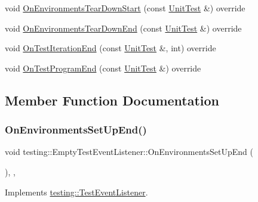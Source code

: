 \begin{DoxyCompactItemize}
\item 
void \hyperlink{classtesting_1_1EmptyTestEventListener_a320780451eac9178434b7c77d948ecbd}{On\+Environments\+Tear\+Down\+Start} (const \hyperlink{classtesting_1_1UnitTest}{Unit\+Test} \&) override
\item 
void \hyperlink{classtesting_1_1EmptyTestEventListener_ad9984052e82c3ae26395a2d9480326d2}{On\+Environments\+Tear\+Down\+End} (const \hyperlink{classtesting_1_1UnitTest}{Unit\+Test} \&) override
\item 
void \hyperlink{classtesting_1_1EmptyTestEventListener_aae9c5c61e476f0c421402fb1dde434d2}{On\+Test\+Iteration\+End} (const \hyperlink{classtesting_1_1UnitTest}{Unit\+Test} \&, int) override
\item 
void \hyperlink{classtesting_1_1EmptyTestEventListener_aaa9d683e8e0c850af67a0b92d785ddb9}{On\+Test\+Program\+End} (const \hyperlink{classtesting_1_1UnitTest}{Unit\+Test} \&) override
\end{DoxyCompactItemize}


\subsection{Member Function Documentation}
\mbox{\label{classtesting_1_1EmptyTestEventListener_a9b4e781c0b38065a55c2fd163724ba69}} 
\subsubsection{\texorpdfstring{On\+Environments\+Set\+Up\+End()}{OnEnvironmentsSetUpEnd()}}
{\footnotesize\ttfamily void testing\+::\+Empty\+Test\+Event\+Listener\+::\+On\+Environments\+Set\+Up\+End (\begin{DoxyParamCaption}\item[{const \hyperlink{classtesting_1_1UnitTest}{Unit\+Test} \&}]{ }\end{DoxyParamCaption})\hspace{0.3cm}{\ttfamily [inline]}, {\ttfamily [override]}, {\ttfamily [virtual]}}



Implements \hyperlink{classtesting_1_1TestEventListener_aaa1021d75f5dbf3f05c829c1cc520341}{testing\+::\+Test\+Event\+Listener}.

